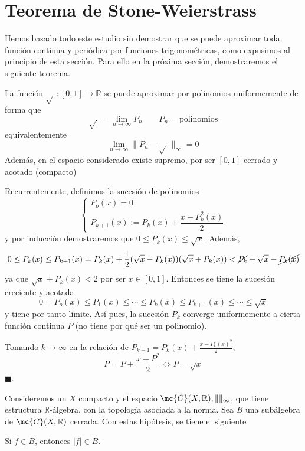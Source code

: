     \section{Teorema de Stone-Weierstrass}
    \begin{obs}
        Hemos basado todo este estudio sin demostrar que se puede aproximar toda función continua y periódica por funciones trigonométricas, como expusimos al principio de esta sección. Para ello en la próxima sección, demostraremos el siguiente teorema.
    \end{obs}
    \begin{lem}
        La función $\sqrt{\:}: [0,1] \longrightarrow \mathbb R$ se puede aproximar por polinomios uniformemente de forma que
        $$\sqrt{\: }=\lim_{n \to \infty} P_n \qquad P_n=\text{polinomios}$$
        equivalentemente
        $$\lim_{n\to \infty} \|P_n-\sqrt{\:}\|_{\infty}=0$$
        Además, en el espacio considerado existe supremo, por ser $[0,1]$ cerrado y acotado (compacto)
    \end{lem}
    \begin{dem}
        Recurrentemente, definimos la sucesión de polinomios
        $$\left\{ \begin{array}{l}
             P_o(x)=0  \\
             P_{k+1}(x):= P_k(x) + \dfrac{x - P_k^2(x)}{2}
        \end{array} \right.$$
        y por inducción demostraremos que $0 \leq P_k(x) \leq \sqrt{x}$. Además, $$0 \leq P_k(x) \leq P_{k+1}(x)=P_k(x) + \dfrac{1}{2}(\sqrt{x}-P_k(x))(\sqrt{x}+P_k(x))< \cancel{P_{k}} + \sqrt{x} - \cancel{P_k(x)}$$
        ya que $\sqrt{x}+P_k(x) < 2$ por ser $x \in [0,1]$. Entonces se tiene la sucesión creciente y acotada
        $$0=P_o(x) \leq P_1(x) \leq \cdots \leq P_k(x) \leq P_{k+1}(x) \leq \cdots \leq \sqrt{x}$$
        y tiene por tanto límite. Así pues, la sucesión $P_k$ converge uniformemente a cierta función continua $P$ (no tiene por qué ser un polinomio). 

        Tomando $k \to \infty$ en la relación de $P_{k+1}=P_k(x)+\frac{x-P_k(x)^2}{2}$, 
        $$P=P+\dfrac{x-P^2}{2} \iff P=\sqrt{x} $$
        \hfill $\blacksquare.$
    \end{dem}
    Consideremos un $X$ compacto y el espacio $\mc{C}(X,\mathbb R), \|\|_{\infty}$, que tiene estructura $\mathbb R$-álgebra, con la topología asociada a la norma. Sea $B$ una subálgebra de $\mc{C}(X,\mathbb R)$ cerrada. Con estas hipótesis, se tiene el siguiente
    \begin{lem}
        Si $f \in B$, entonces $|f| \in B$.
    \end{lem}
